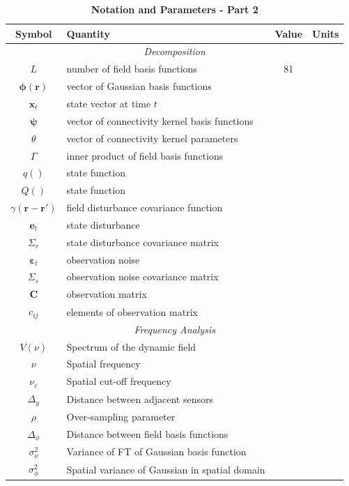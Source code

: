 \documentclass[10pt]{article}
\begin{document}
\begin{table}[!ht]
\caption{
\bf{Notation and Parameters - Part 2}}
\begin{tabular}{|c|l|c|c|}
	\hline
	\textbf{Symbol} & \textbf{Quantity} & \textbf{Value} & \textbf{Units}\\
	\hline
	\multicolumn{4}{|c|}{\emph{Decomposition}} \\
	\hline
    $L$ & number of field basis functions & 81 & \\
   	$\boldsymbol\phi(\mathbf{r})$ & vector of Gaussian basis functions & & \\
   	$\mathbf{x}_t$ & state vector at time $t$ & & \\
   	$\boldsymbol{\psi}$ & vector of connectivity kernel basis functions & & \\
   	$\theta$ & vector of connectivity kernel parameters & & \\
   	$\Gamma$ & inner product of field basis functions & &\\
   	$q()$ & state function & &\\
   	$Q()$ & state function & &\\
	$\gamma(\mathbf r-\mathbf r')$& field disturbance covariance function & &\\
   	$\mathbf{e}_t$ & state disturbance & &\\
	$\Sigma_e$ &state disturbance covariance matrix& &\\
	$\mathbf{\varepsilon}_t$ & observation noise & &\\
	$\Sigma_{\varepsilon}$ &observation noise covariance matrix& &\\
   	$\mathbf{C}$ & observation matrix& & \\
	$c_{ij}$& elements of observation matrix & & \\
	\hline
	\multicolumn{4}{|c|}{\emph{Frequency Analysis}} \\
	\hline
    $V(\nu)$ & Spectrum of the dynamic field & &\\
	$\nu$ & Spatial frequency & &\\
	$\nu_c$ & Spatial cut-off frequency & &\\
	$\Delta_y$ & Distance between adjacent sensors & &\\
	$\rho$ & Over-sampling parameter & &\\
	$\Delta_{\phi}$ & Distance between field basis functions & &\\
	$\sigma_{\nu}^2$ & Variance of FT of Gaussian basis function & &\\
	$\sigma^2_{\phi}$ & Spatial variance of Gaussian in spatial domain & &\\

\end{tabular}
\end{table}
\end{document}

